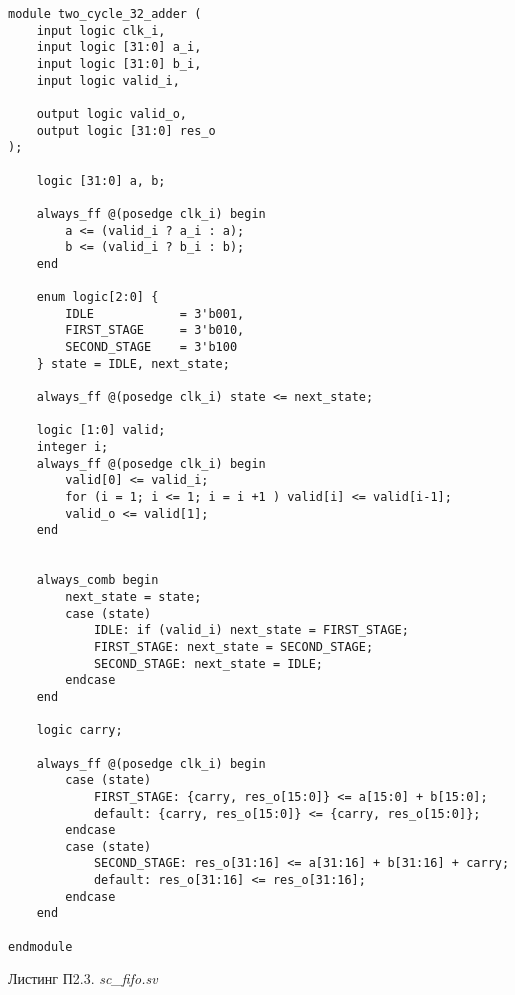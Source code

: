 \begin{lstlisting}
module two_cycle_32_adder (
    input logic clk_i,
    input logic [31:0] a_i,
    input logic [31:0] b_i,
    input logic valid_i,

    output logic valid_o,
    output logic [31:0] res_o
);
    
    logic [31:0] a, b;

    always_ff @(posedge clk_i) begin
        a <= (valid_i ? a_i : a);
        b <= (valid_i ? b_i : b);
    end

    enum logic[2:0] {
        IDLE            = 3'b001, 
        FIRST_STAGE     = 3'b010, 
        SECOND_STAGE    = 3'b100
    } state = IDLE, next_state;

    always_ff @(posedge clk_i) state <= next_state;
  
    logic [1:0] valid;
    integer i;
    always_ff @(posedge clk_i) begin
        valid[0] <= valid_i;
        for (i = 1; i <= 1; i = i +1 ) valid[i] <= valid[i-1];
        valid_o <= valid[1];
    end


    always_comb begin
        next_state = state;
        case (state)
            IDLE: if (valid_i) next_state = FIRST_STAGE;
            FIRST_STAGE: next_state = SECOND_STAGE;
            SECOND_STAGE: next_state = IDLE;
        endcase
    end

    logic carry;

    always_ff @(posedge clk_i) begin
        case (state) 
            FIRST_STAGE: {carry, res_o[15:0]} <= a[15:0] + b[15:0];
            default: {carry, res_o[15:0]} <= {carry, res_o[15:0]};
        endcase
        case (state)
            SECOND_STAGE: res_o[31:16] <= a[31:16] + b[31:16] + carry;
            default: res_o[31:16] <= res_o[31:16];
        endcase
    end

endmodule
\end{lstlisting}

\begin{flushright}
Листинг П2.3. \emph{sc\_fifo.sv}
\end{flushright}

